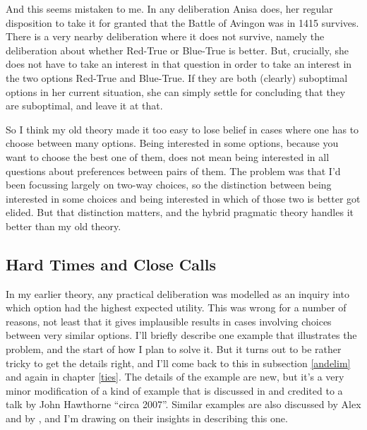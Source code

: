 \documentclass[11pt,]{book}
\begin{document}
And this seems mistaken to me. In any deliberation Anisa does, her regular disposition to take it for granted that the Battle of Avingon was in 1415 survives. There is a very nearby deliberation where it does not survive, namely the deliberation about whether Red-True or Blue-True is better. But, crucially, she does not have to take an interest in that question in order to take an interest in the two options Red-True and Blue-True. If they are both (clearly) suboptimal options in her current situation, she can simply settle for concluding that they are suboptimal, and leave it at that.

So I think my old theory made it too easy to lose belief in cases where one has to choose between many options. Being interested in some options, because you want to choose the best one of them, does not mean being interested in all questions about preferences between pairs of them. The problem was that I'd been focussing largely on two-way choices, so the distinction between being interested in some choices and being interested in which of those two is better got elided. But that distinction matters, and the hybrid pragmatic theory handles it better than my old theory.

\hypertarget{meties}{%
\subsection{Hard Times and Close Calls}\label{meties}}

In my earlier theory, any practical deliberation was modelled as an inquiry into which option had the highest expected utility. This was wrong for a number of reasons, not least that it gives implausible results in cases involving choices between very similar options. I'll briefly describe one example that illustrates the problem, and the start of how I plan to solve it. But it turns out to be rather tricky to get the details right, and I'll come back to this in subsection \ref{andelim} and again in chapter \ref{ties}. The details of the example are new, but it's a very minor modification of a kind of example that is discussed in \citet{McGrathKim2019} and credited to a talk by John Hawthorne ``circa 2007''. Similar examples are also discussed by Alex \citet{Zweber2016} and by \citet{AndersonHawthorne2019b}, and I'm drawing on their insights in describing this one.
\end{document}
